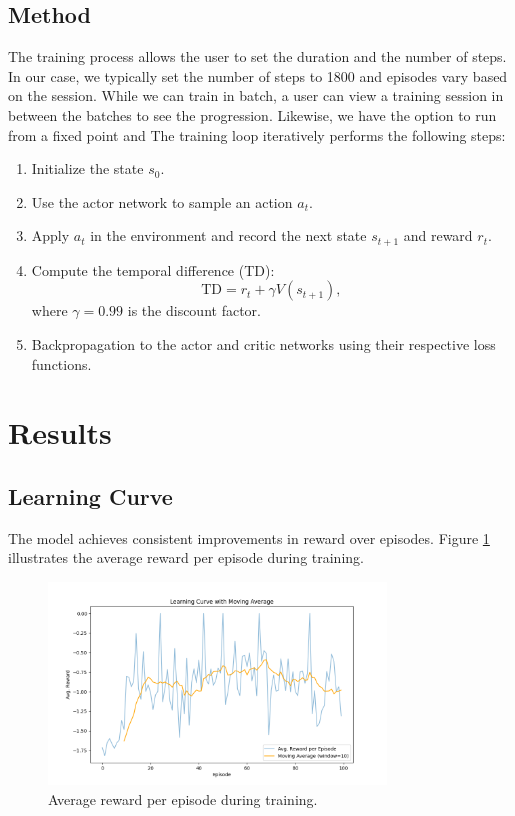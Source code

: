 \documentclass[12pt]{article}
\begin{document}
\subsection{Method}
The training process allows the user to set the duration and the number of steps. In our case, we typically set the number of steps to 1800 and episodes vary based on the session. While we can train in batch, a user can view a training session in between the batches to see the progression. Likewise, we have the option to run from a fixed point and 
The training loop iteratively performs the following steps:
\begin{enumerate}
    \item Initialize the state \(s_0\).
    \item Use the actor network to sample an action \(a_t\).
    \item Apply \(a_t\) in the environment and record the next state \(s_{t+1}\) and reward \(r_t\).
    \item Compute the temporal difference (TD):
    \[\text{TD} = r_t + \gamma V(s_{t+1}),\]
    where $\gamma=0.99$ is the discount factor.
    \item Backpropagation to the actor and critic networks using their respective loss functions.
\end{enumerate}

\section{Results}

\subsection{Learning Curve}
The model achieves consistent improvements in reward over episodes. Figure \ref{fig:learning_curve} illustrates the average reward per episode during training.

\begin{figure}[H]
    \centering
    \includegraphics[width=0.8\textwidth]{report/images/learning.png}
    \caption{Average reward per episode during training.}
    \label{fig:learning_curve}
\end{figure}
\end{document}
